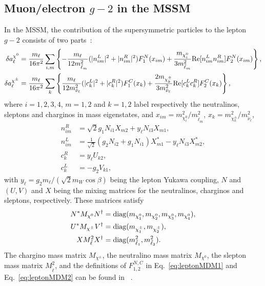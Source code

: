 \documentclass[a4paper,11pt]{article}
\begin{document}
   \subsection{Muon/electron \texorpdfstring{$g-2$}{g-2} in the MSSM}
   In the MSSM, the contribution of the supersymmetric particles to the lepton $g-2$ consists of two parts~\cite{Martin:2001st}:
   \begin{align}\label{eq:leptonMDM1}
	\delta a_{\ell}^{\chi^0} & =  \frac{m_{\ell}}{16\pi^2}
    \sum_{i,m}\left\{ -\frac{m_{\ell}}{ 12 m^2_{\tilde\ell_m}}
    (|n^L_{im}|^2+ |n^R_{im}|^2)F^N_1(x_{im}) 
    +\frac{m_{\chi^0_i}}{3 m^2_{\tilde\ell_m}}
    {\rm Re}[n^L_{im}n^R_{im}] F^N_2(x_{im})\right\}, \\
    \label{eq:leptonMDM2}
    \delta a_{\ell}^{\chi^\pm} & =  \frac{m_{\ell}}{16\pi^2}\sum_k
    \left\{ \frac{m_\ell}{ 12 m^2_{\tilde\nu_\ell}}
    (|c^L_k|^2+ |c^R_k|^2)F^C_1(x_k)
    +\frac{2m_{\chi^\pm_k}}{3m^2_{\tilde\nu_\ell}} {\rm Re}[ c^L_kc^R_k] F^C_2(x_k)\right\},
   \end{align}
   where $i= 1,2,3,4$,  $m= 1,2$ and $k= 1,2$ label respectively the neutralinos, sleptons and charginos in mass eigenstates, and $x_{im}=m^2_{\chi^0_i}/m^2_{\tilde \ell_m}$, $x_k=m^2_{\chi^{\pm}_k}/m^2_{\tilde \nu_\ell}$,
   \begin{align}
      \label{eq:nRim}
      n^R_{im} &= \sqrt2 g_1 N_{i1}X_{m2}+y_\ell N_{i3}X_{m1},\\
      \label{eq:nLim}
      n^L_{im} &= \frac{1}{\sqrt2}(g_2 N_{i2}+g_1 N_{i1})X^*_{m1}-y_\ell N_{i3}X^*_{m2},\\
      c^R_k &= y_\ell U_{k2},\\
      c^L_k &= -g_2 V_{k1},
   \end{align}
   with $y_\ell=g_2 m_\ell/(\sqrt2 m_W\cos\beta)$ being the lepton Yukawa coupling, $N$ and $(U,V)$ and $X$ being the mixing matrices for the neutralinos, charginos and sleptons, respectively. These matrices satisfy
   \begin{align}
       N^*M_{\chi^0}N^\dagger &= {\rm diag}(m_{\chi^0_1},m_{\chi^0_2},m_{\chi^0_3},m_{\chi^0_4}),\\
       U^*M_{\chi^\pm} V^\dagger &= {\rm diag}(m_{\chi^\pm_1},m_{\chi^\pm_2}), \\
       X M^2_{\tilde\ell} X^\dagger &= {\rm diag}(m^2_{\tilde\ell_1}, m^2_{\tilde\ell_2}).
   \end{align}
   The chargino mass matrix $M_{\chi^\pm}$, the neutralino mass matrix $M_{\chi^0}$, the slepton mass matrix $M^2_{\tilde\ell}$, and the definitions of $F_{1,2}^{N,C}$ in Eq.~\eqref{eq:leptonMDM1} and Eq.~\eqref{eq:leptonMDM2} can be found in ~\cite{Martin:2001st}.
   
\end{document}
